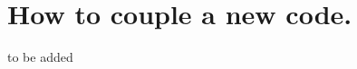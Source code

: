 \section{How to couple a new code.  \\ \vspace{2 mm} {\small }}
\label{sec:newCodeCoupling}
to be added 

